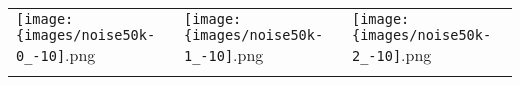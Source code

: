  \begin{tabular}{lll}
\texttt{[image: \{images/noise50k-0\_-10]}.png} &\texttt{[image: \{images/noise50k-1\_-10]}.png} &\texttt{[image: \{images/noise50k-2\_-10]}.png} 
 \\ \hfill\end{tabular}